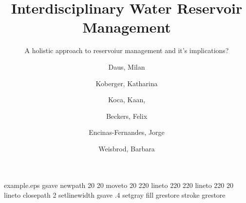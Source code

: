 %
%
%
%
%
\begin{filecontents*}{example.eps}
gsave
newpath
  20 20 moveto
  20 220 lineto
  220 220 lineto
  220 20 lineto
closepath
2 setlinewidth
gsave
  .4 setgray fill
grestore
stroke
grestore
\end{filecontents*}
%
\RequirePackage{fix-cm}
%
\documentclass[smallextended]{svjour3}       %
%
\smartqed  %
%
\usepackage{graphicx}
%
%
%
%
%


\title{Interdisciplinary Water Reservoir Management%
}
\subtitle{A holistic approach to reservoiur management and it's implications?\\ }


\author{Daus, Milan       \and
       Koberger, Katharina\and Koca, Kaan, \and Beckers, Felix \and Encinas-Fernandes, Jorge \and Weisbrod, Barbara
}


